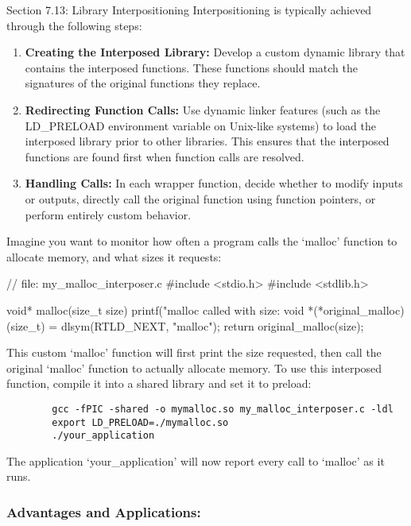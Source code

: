 \begin{notes}{Section 7.13: Library Interpositioning}
    Interpositioning is typically achieved through the following steps:
    \begin{enumerate}
        \item \textbf{Creating the Interposed Library:} Develop a custom dynamic library that contains the interposed functions. These functions should match the signatures of the original functions they replace.
        \item \textbf{Redirecting Function Calls:} Use dynamic linker features (such as the LD\_PRELOAD environment variable on Unix-like systems) to load the interposed library prior to other libraries. 
        This ensures that the interposed functions are found first when function calls are resolved.
        \item \textbf{Handling Calls:} In each wrapper function, decide whether to modify inputs or outputs, directly call the original function using function pointers, or perform entirely custom behavior.
    \end{enumerate}
    
    \begin{highlight}
        Imagine you want to monitor how often a program calls the `malloc' function to allocate memory, and what sizes it requests:
    \begin{code}[C]
    // file: my_malloc_interposer.c
    #include <stdio.h>
    #include <stdlib.h>

    void* malloc(size_t size) {
        printf("malloc called with size: %
        void *(*original_malloc)(size_t) = dlsym(RTLD_NEXT, "malloc");
        return original_malloc(size);
    }
    \end{code}
        This custom `malloc' function will first print the size requested, then call the original `malloc' function to actually allocate memory. To use this interposed function, compile it into a shared 
        library and set it to preload:
        \begin{verbatim}
        gcc -fPIC -shared -o mymalloc.so my_malloc_interposer.c -ldl
        export LD_PRELOAD=./mymalloc.so
        ./your_application
        \end{verbatim}
        The application `your\_application' will now report every call to `malloc' as it runs.
    \end{highlight}
    
    \subsubsection*{Advantages and Applications:}
    

\end{notes}
